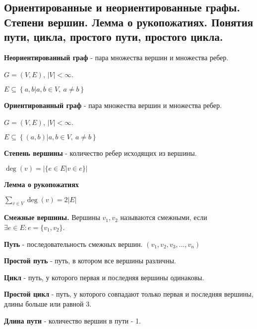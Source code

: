 \subsection{Ориентированные и неориентированные графы. Степени вершин. Лемма о рукопожатиях. Понятия пути, цикла, простого пути, простого цикла.}
\textbf{Неориентированный граф} - пара множества вершин и множества ребер.

$G = (V, E)$, $|V| < \infty$.

$E \subseteq \left\{ {a, b} | a, b \in V, \ a \neq b\right\}$

\textbf{Ориентированный граф} - пара множества вершин и множества ребер.

$G = (V, E)$, $|V| < \infty$.

$E \subseteq \left\{ (a, b) | a, b \in V, \ a \neq b\right\}$

\textbf{Степень вершины} - количество ребер исходящих из вершины.

$\deg (v) = |\{e \in E | v \in e\}|$

\textbf{Лемма о рукопожатиях}

$\sum\limits_{v \in V} \deg (v) = 2 |E|$

\textbf{Смежные вершины.} Вершины $v_1, v_2$ называются смежными, если $\exists e \in E : e = \{v_1, v_2\}$.

\textbf{Путь} - последовательность смежных вершин. $(v_1, v_2, v_3, ..., v_n)$

\textbf{Простой путь} - путь, в котором все вершины различны.

\textbf{Цикл} - путь, у которого первая и последняя вершины одинаковы.

\textbf{Простой цикл} - путь, у которого совпадают только первая и последняя вершины, длины больше или равной 3.

\textbf{Длина пути} - количество вершин в пути - 1.